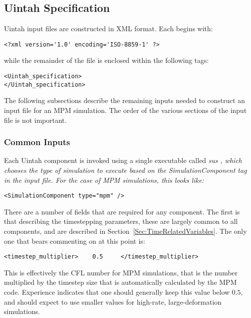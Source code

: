 \subsection{Uintah Specification} \label{Sec:UintahSpecMPM}

Uintah input files are constructed in XML format.  Each begins with:

\begin{Verbatim}[fontsize=\footnotesize]
<?xml version='1.0' encoding='ISO-8859-1' ?>
\end{Verbatim}
while the remainder of the file is enclosed within the following tags:
\begin{Verbatim}[fontsize=\footnotesize]
<Uintah_specification>
</Uintah_specification>
\end{Verbatim}

The following subsections describe the remaining inputs needed to construct
an input file for an MPM simulation.  The order of the various sections 
of the input file is not important.

\subsubsection{Common Inputs}

Each Uintah component is invoked using a single executable called
\it sus \normalfont, which chooses the type of simulation
to execute based on the \it SimulationComponent \normalfont tag in the
input file.  For the case of MPM simulations, this looks like:

\begin{Verbatim}[fontsize=\footnotesize]
 <SimulationComponent type="mpm" />
\end{Verbatim}

There are a number of fields that are required for any component.  The first
is that describing the timestepping parameters, these are largely common to
all components, and are described in Section~\ref{Sec:TimeRelatedVariables}.
The only one that bears commenting on at this point is:

\begin{Verbatim}[fontsize=\footnotesize]
  <timestep_multiplier>    0.5     </timestep_multiplier>
\end{Verbatim}
This is effectively the CFL number for MPM simulations, that is the number
multiplied by the timestep size that is automatically calculated by the MPM
code.  Experience indicates that one should generally keep this value below
$0.5$, and should expect to use smaller values for high-rate, large-deformation
simulations.

